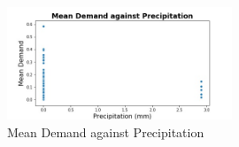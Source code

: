 \documentclass[12pt, letterpaper] {article}
\begin{document}
\begin{figure}[H]
    \centering
    \includegraphics[width=0.6\textwidth, height=0.3\textheight]{Images/prec_mean_demand.jpg}
    \caption{Mean Demand against Precipitation}
    \label{fig:Mean Demand against Precipitation}
\end{figure}

 

\end{document}
